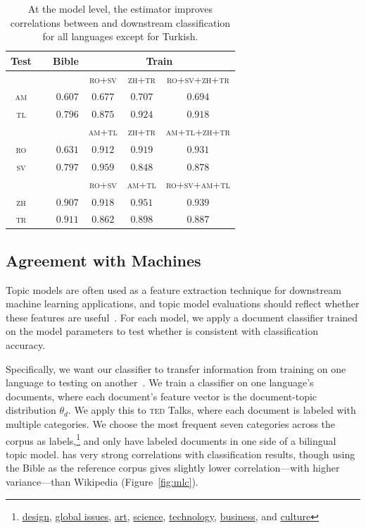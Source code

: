 \begin{table}
	\centering
	\small
		\begin{tabular}{crccc}
			\hline
			\textbf{Test} & \textbf{Bible} & \multicolumn{3}{c}{\textbf{Train}} \\ \hline\hline
			& & \textsc{ro+sv} & \textsc{zh+tr} & \textsc{ro+sv+zh+tr} \\ \cline{3-5}
			\textsc{am} &  \ \ \ $0.607$ & $0.677$ & $0.707$ &  $0.694$ \\
			\textsc{tl} &  $0.796$ & $0.875$ & $0.924$ &  $0.918$ \\ \hline
			& & \textsc{am+tl} & \textsc{zh+tr} & \textsc{am+tl+zh+tr} \\  \cline{3-5}
			\textsc{ro} &  $0.631$ & $0.912$ & $0.919$ &  $0.931$ \\
			\textsc{sv} &  $0.797$ & $0.959$ & $0.848$ &  $0.878$ \\ \hline
			& & \textsc{ro+sv} & \textsc{am+tl} & \textsc{ro+sv+am+tl} \\  \cline{3-5}
			\textsc{zh} &  $0.907$ & $0.918$ & $0.951$ &  $0.939$ \\
			\textsc{tr} &  $0.911$ & $0.862$ & $0.898$ &  $0.887$ \\ \hline
		\end{tabular}
                \caption{At the model level, the estimator improves correlations between \cnpmi{}
                  and downstream classification for all languages except for Turkish.}
	\label{tab:est-model}
\end{table}


\subsection{Agreement with Machines}
\label{sec:add-links}

Topic models are often used as a feature extraction technique for downstream machine
learning applications, and topic model evaluations should reflect
whether these features are useful~\cite{RamageHNM09}.  For each model, we apply a
document classifier trained on the model parameters to test whether
\cnpmi{} is consistent with classification accuracy.

Specifically, we want our classifier to transfer information from
training on one language to testing on another~\cite{SmetTM11,HeymanVM16}.  We train a classifier
on one language's documents, where each document's feature vector is
the document-topic distribution $\theta_d$.  We apply this to
\textsc{ted} Talks, where each document is labeled with multiple
categories. We choose the most frequent seven categories across the
corpus as labels,\footnote{\underline{design}, \underline{global
    issues}, \underline{art}, \underline{science},
  \underline{technology}, \underline{business}, and
  \underline{culture}} and only have labeled documents in one side of
a bilingual topic model.  \cnpmi{} has very strong correlations with
classification results, though using the Bible as the reference corpus
gives slightly lower correlation---with higher variance---than
Wikipedia (Figure~\ref{fig:mlc}).


